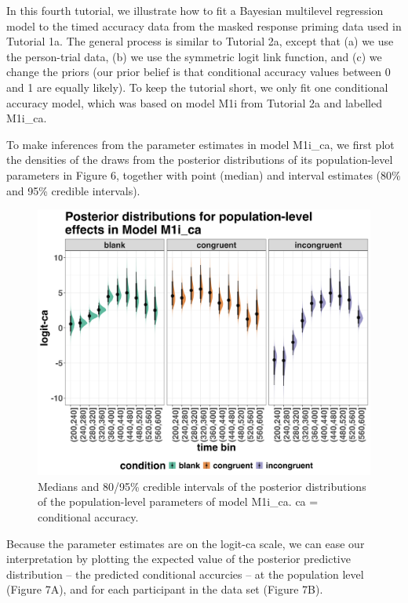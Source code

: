 \documentclass[
  man, donotrepeattitle,floatsintext]{apa6}
\begin{document}
In this fourth tutorial, we illustrate how to fit a Bayesian multilevel regression model to the timed accuracy data from the masked response priming data used in Tutorial 1a. The general process is similar to Tutorial 2a, except that (a) we use the person-trial data, (b) we use the symmetric logit link function, and (c) we change the priors (our prior belief is that conditional accuracy values between 0 and 1 are equally likely). To keep the tutorial short, we only fit one conditional accuracy model, which was based on model M1i from Tutorial 2a and labelled M1i\_ca.

To make inferences from the parameter estimates in model M1i\_ca, we first plot the densities of the draws from the posterior distributions of its population-level parameters in Figure 6, together with point (median) and interval estimates (80\% and 95\% credible intervals).



\begin{figure}[H]

{\centering \includegraphics[width=0.8\linewidth,height=0.67\textheight,]{../Tutorial_2_Bayesian/figures/M1i_ca_postdistr} 

}

\caption{Medians and 80/95\% credible intervals of the posterior distributions of the population-level parameters of model M1i\_ca. ca = conditional accuracy.}\label{fig:plot-ca-fixed-effects}
\end{figure}

Because the parameter estimates are on the logit-ca scale, we can ease our interpretation by plotting the expected value of the posterior predictive distribution -- the predicted conditional accurcies -- at the population level (Figure 7A), and for each participant in the data set (Figure 7B).
\end{document}
